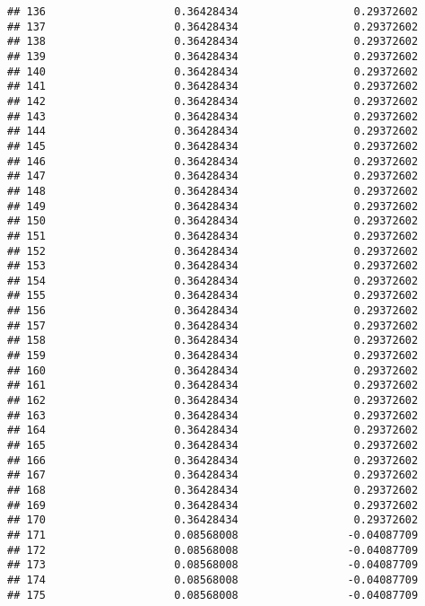\documentclass[]{article}
\begin{document}
\begin{verbatim}
## 136                    0.36428434                  0.29372602
## 137                    0.36428434                  0.29372602
## 138                    0.36428434                  0.29372602
## 139                    0.36428434                  0.29372602
## 140                    0.36428434                  0.29372602
## 141                    0.36428434                  0.29372602
## 142                    0.36428434                  0.29372602
## 143                    0.36428434                  0.29372602
## 144                    0.36428434                  0.29372602
## 145                    0.36428434                  0.29372602
## 146                    0.36428434                  0.29372602
## 147                    0.36428434                  0.29372602
## 148                    0.36428434                  0.29372602
## 149                    0.36428434                  0.29372602
## 150                    0.36428434                  0.29372602
## 151                    0.36428434                  0.29372602
## 152                    0.36428434                  0.29372602
## 153                    0.36428434                  0.29372602
## 154                    0.36428434                  0.29372602
## 155                    0.36428434                  0.29372602
## 156                    0.36428434                  0.29372602
## 157                    0.36428434                  0.29372602
## 158                    0.36428434                  0.29372602
## 159                    0.36428434                  0.29372602
## 160                    0.36428434                  0.29372602
## 161                    0.36428434                  0.29372602
## 162                    0.36428434                  0.29372602
## 163                    0.36428434                  0.29372602
## 164                    0.36428434                  0.29372602
## 165                    0.36428434                  0.29372602
## 166                    0.36428434                  0.29372602
## 167                    0.36428434                  0.29372602
## 168                    0.36428434                  0.29372602
## 169                    0.36428434                  0.29372602
## 170                    0.36428434                  0.29372602
## 171                    0.08568008                 -0.04087709
## 172                    0.08568008                 -0.04087709
## 173                    0.08568008                 -0.04087709
## 174                    0.08568008                 -0.04087709
## 175                    0.08568008                 -0.04087709

\end{verbatim}
\end{document}
